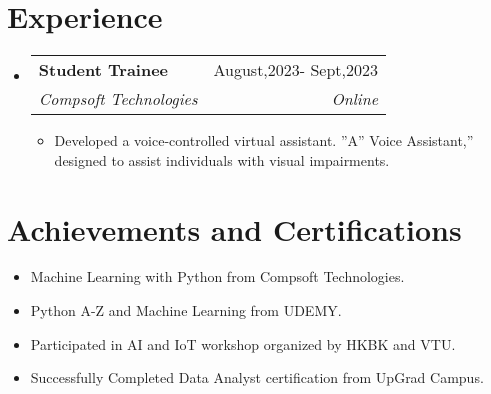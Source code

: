 \documentclass[letterpaper,11pt]{article}
\makeatletter
\newcommand{\resumeItem}[1]{
  \item\small{
    {#1 \vspace{-2pt}}
  }
}
\newcommand{\resumeSubheading}[4]{
  \vspace{-2pt}\item
    \begin{tabular*}{0.97\textwidth}[t]{l@{\extracolsep{\fill}}r}
      \textbf{#1} & #2 \\
      \textit{\small#3} & \textit{\small #4} \\
    \end{tabular*}\vspace{-7pt}
}
\newcommand{\resumeSubHeadingListStart}{\begin{itemize}[leftmargin=0.15in, label={}]}
\newcommand{\resumeSubHeadingListEnd}{\end{itemize}}
\newcommand{\resumeItemListStart}{\begin{itemize}}
\newcommand{\resumeItemListEnd}{\end{itemize}\vspace{-5pt}}
\makeatother
\begin{document}
\section{Experience}
\resumeSubHeadingListStart
  \resumeSubheading
    {Student Trainee}{August,2023- Sept,2023}
    {Compsoft Technologies}{Online}
    \resumeItemListStart
      \resumeItem{Developed a voice-controlled virtual assistant. ”A” Voice Assistant,” designed to assist individuals with visual impairments.}
      
    \resumeItemListEnd

\resumeSubHeadingListEnd

\section{Achievements and Certifications}
\resumeItemListStart
  \resumeItem{Machine Learning with Python from Compsoft Technologies.}
  \resumeItem{Python A-Z and Machine Learning from UDEMY.}
  \resumeItem{Participated in AI and IoT workshop organized by HKBK and VTU.}
  \resumeItem{ Successfully Completed Data Analyst certification from UpGrad Campus.}
\resumeItemListEnd
\end{document}
